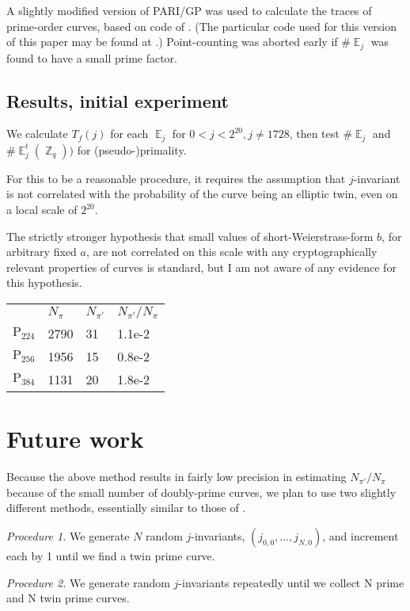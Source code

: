 \documentclass[11pt,fleqn]{article}
\newcommand{\Ejt}{\ensuremath{\BbbE^t_j(\BbbZ_q))} }
\newcommand{\Tf}{\ensuremath{T_f(j)} }
\newcommand{\Pa}{\ensuremath{\mathup{P}_{224}} }
\newcommand{\Pb}{\ensuremath{\mathup{P}_{256}} }
\newcommand{\Pc}{\ensuremath{\mathup{P}_{384}} }
\newcommand{\Ej}{\ensuremath{\BbbE_j} }
\begin{document}
A slightly modified version of PARI/GP was used to calculate the
traces of prime-order curves, based on code of \autocite{HamburgPARI}.
(The particular code used for this version of this paper may be
found at \autocite{junkpari}.) Point-counting was aborted early
if $\#\Ej$ was found to have a small prime factor.

\subsection{Results, initial experiment} 

We calculate \Tf for each \Ej for $0 < j < 2^{20}, j \neq 1728$, then
test $\#\Ej$ and $\#\Ejt$ for (pseudo-)primality.

For this to be a reasonable procedure, it requires the assumption that
$j$-invariant is not correlated with the probability of the curve being
an elliptic twin, even on a local scale of $2^{20}$.

The strictly stronger hypothesis that small values of short-Weierstrass-form
$b$, for arbitrary fixed $a$, are not correlated on this scale with any
cryptographically relevant properties of curves is standard, but I am not
aware of any evidence for this hypothesis.

\begin{tabular}[l]{l|lll}
      & $N_{\pi}$ & $N_{\pi'}$ & $N_{\pi'} / N_{\pi}$ \\
  \Pa & 2790 & 31 & 1.1e-2 \\
  \Pb & 1956 & 15 & 0.8e-2 \\
  \Pc & 1131 & 20 & 1.8e-2 \\
\end{tabular}

\section{Future work}

Because the above method results in fairly low precision in estimating
$N_{\pi'} / N_{\pi}$ because of the small number of doubly-prime curves,
we plan to use two slightly different methods, essentially similar to those
of \autocite{ShparlinskiSutantyo}.

\emph{Procedure 1.} We generate $N$ random $j$-invariants,
$(j_{0,0}, \ldots, j_{N,0})$, and increment each by 1 until we
find a twin prime curve.

\emph{Procedure 2.} We generate random $j$-invariants repeatedly
until we collect N prime and N twin prime curves.
\end{document}

